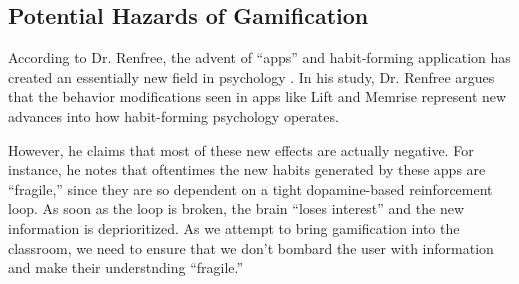 \subsection{Potential Hazards of Gamification}
According to Dr. Renfree, the advent of ``apps'' and habit-forming application has created an essentially new field in psychology \cite{renfree2016don}. In his study, Dr. Renfree argues that the behavior modifications seen in apps like Lift and Memrise represent new advances into how habit-forming psychology operates.

\par However, he claims that most of these new effects are actually negative. For instance, he notes that oftentimes the new habits generated by these apps are ``fragile,'' since they are so dependent on a tight dopamine-based reinforcement loop. As soon as the loop is broken, the brain ``loses interest'' and the new information is deprioritized. As we attempt to bring gamification into the classroom, we need to ensure that we don't bombard the user with information and make their understnding ``fragile.''




